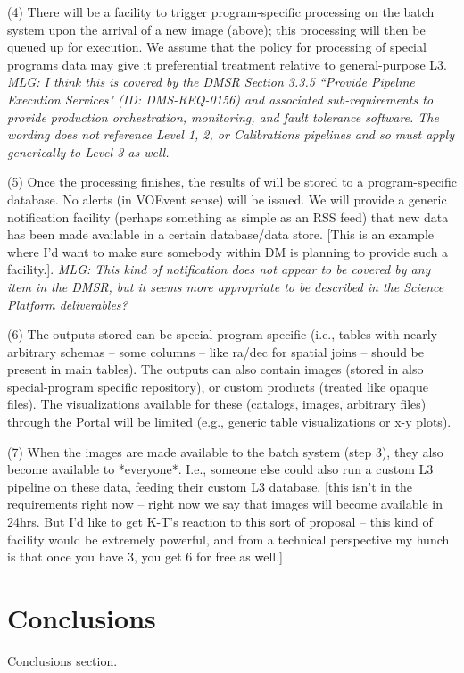 \documentclass[DM,lsstdraft,toc]{lsstdoc}
\begin{document}
(4) There will be a facility to trigger program-specific processing on the batch system upon the arrival of a new image (above); this processing will then be queued up for execution. We assume that the policy for processing of special programs data may give it preferential treatment relative to general-purpose L3. {\it MLG: I think this is covered by the DMSR Section 3.3.5 ``Provide Pipeline Execution Services" (ID: DMS-REQ-0156) and associated sub-requirements to provide production orchestration, monitoring, and fault tolerance software. The wording does not reference Level 1, 2, or Calibrations pipelines and so must apply generically to Level 3 as well.}

(5) Once the processing finishes, the results of will be stored to a program-specific database. No alerts (in VOEvent sense) will be issued. We will provide a generic notification facility (perhaps something as simple as an RSS feed) that new data has been made available in a certain database/data store. [This is an example where I'd want to make sure somebody within DM is planning to provide such a facility.]. {\it MLG: This kind of notification does not appear to be covered by any item in the DMSR, but it seems more appropriate to be described in the Science Platform deliverables?}

(6) The outputs stored can be special-program specific (i.e., tables with nearly arbitrary schemas -- some columns -- like ra/dec for spatial joins -- should be present in main tables). The outputs can also contain images (stored in also special-program specific repository), or custom products (treated like opaque files). The visualizations available for these (catalogs, images, arbitrary files) through the Portal will be limited (e.g., generic table visualizations or x-y plots).

(7) When the images are made available to the batch system (step 3), they also become available to *everyone*. I.e., someone else could also run a custom L3 pipeline on these data, feeding their custom L3 database. [this isn't in the requirements right now -- right now we say that images will become available in 24hrs. But I'd like to get K-T's reaction to this sort of proposal -- this kind of facility would be extremely powerful, and from a technical perspective my hunch is that once you have 3, you get 6 for free as well.]



\section{Conclusions}\label{sec:conc}

Conclusions section.

%


\end{document}
